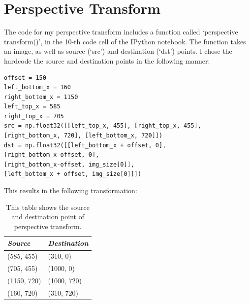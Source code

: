 \documentclass[draftcls,onecolumn,12pt]{IEEEtran}
\theoremstyle{plain}
\theoremstyle{plain}
\begin{document}
\section{Perspective Transform}
The code for my perspective transform includes a function called `perspective transform()', in the 10-th code cell of the IPython notebook.  The function takes an image, as well as source (`src') and destination (`dst') points. I chose the hardcode the source and destination points in the following manner:

\begin{verbatim}
offset = 150
left_bottom_x = 160
right_bottom_x = 1150
left_top_x = 585
right_top_x = 705
src = np.float32([[left_top_x, 455], [right_top_x, 455], 
[right_bottom_x, 720], [left_bottom_x, 720]])
dst = np.float32([[left_bottom_x + offset, 0], 
[right_bottom_x-offset, 0],
[right_bottom_x-offset, img_size[0]], 
[left_bottom_x + offset, img_size[0]]])
\end{verbatim}

This results in the following transformation:
\begin{table}[!h]
\centering
\begin{tabular}{@{} *2l @{}}    \toprule
\emph{Source} & \emph{Destination} \\ \midrule
(585, 455)  & (310, 0) \\  \hline
(705, 455)  &  (1000, 0)\\  \hline
(1150, 720)  &  (1000, 720)\\  \hline
(160, 720)  &  (310, 720)\\  \bottomrule \hline
\end{tabular}\caption{This table shows the source and destination point of perspective transform.}\label{Tab:PerspectiveTransform}
\end{table}
\end{document}

